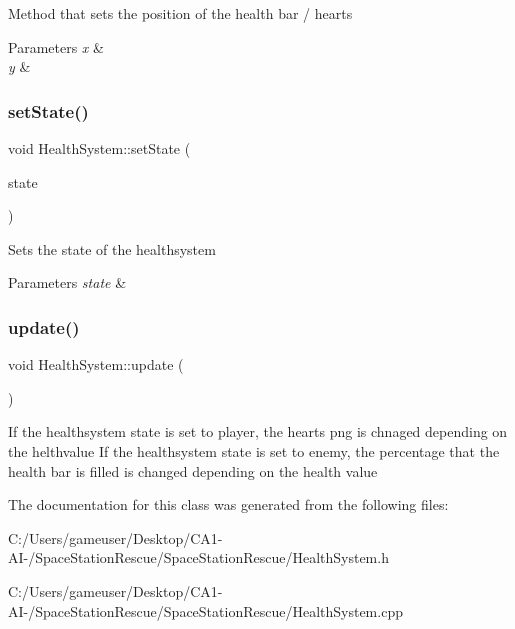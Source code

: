 Method that sets the position of the health bar / hearts 


\begin{DoxyParams}{Parameters}
{\em x} & \\
\hline
{\em y} & \\
\hline
\end{DoxyParams}
\mbox{\label{class_health_system_a01566694009124a5994accfa1cecb687}} 
\subsubsection{\texorpdfstring{setState()}{setState()}}
{\footnotesize\ttfamily void Health\+System\+::set\+State (\begin{DoxyParamCaption}\item[{hs\+State}]{state }\end{DoxyParamCaption})}



Sets the state of the healthsystem 


\begin{DoxyParams}{Parameters}
{\em state} & \\
\hline
\end{DoxyParams}
\mbox{\label{class_health_system_a9378f97771d046d67c794c3ec08f3d9e}} 
\subsubsection{\texorpdfstring{update()}{update()}}
{\footnotesize\ttfamily void Health\+System\+::update (\begin{DoxyParamCaption}{ }\end{DoxyParamCaption})}



If the healthsystem state is set to player, the hearts png is chnaged depending on the helthvalue If the healthsystem state is set to enemy, the percentage that the health bar is filled is changed depending on the health value 



The documentation for this class was generated from the following files\+:\begin{DoxyCompactItemize}
\item 
C\+:/\+Users/gameuser/\+Desktop/\+C\+A1-\/\+A\+I-\//\+Space\+Station\+Rescue/\+Space\+Station\+Rescue/Health\+System.\+h\item 
C\+:/\+Users/gameuser/\+Desktop/\+C\+A1-\/\+A\+I-\//\+Space\+Station\+Rescue/\+Space\+Station\+Rescue/Health\+System.\+cpp\end{DoxyCompactItemize}
